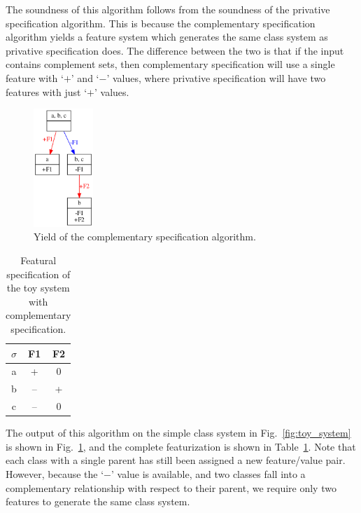 \documentclass[12pt, oneside]{article}   	%
\begin{document}
\noindent The soundness of this algorithm follows from the soundness of the privative specification algorithm. This is because the complementary specification algorithm yields a feature system which generates the same class system as privative specification does. The difference between the two is that if the input contains complement sets, then complementary specification will use a single feature with `$+$' and `$-$' values, where privative specification will have two features with just `$+$' values.

\begin{figure}[htb!]
	\centering
	\includegraphics[width=0.2\textwidth]{toy_system_contrastive_under_features.png}
	\caption{Yield of the complementary specification algorithm.}
	\label{fig:toy_system_contrastive_under_features}
\end{figure}

\begin{table}[h]
	\centering
	\begin{tabular} {|c||c|c|}
		\hline
		$\sigma$ & F1 & F2 \\ \hline
		a & + & 0 \\
		b & -- & + \\
		c & -- & 0 \\
		\hline
	\end{tabular}
	\caption{Featural specification of the toy system with complementary specification.}
	\label{table:toy_system_contrastive_under}
\end{table}

The output of this algorithm on the simple class system in Fig.~\ref{fig:toy_system} is shown in Fig.~\ref{fig:toy_system_contrastive_under_features}, and the complete featurization is shown in Table~\ref{table:toy_system_contrastive_under}. Note that each class with a single parent has still been assigned a new feature/value pair. However, because the `$-$' value is available, and two classes fall into a complementary relationship with respect to their parent, we require only two features to generate the same class system.
\end{document}
